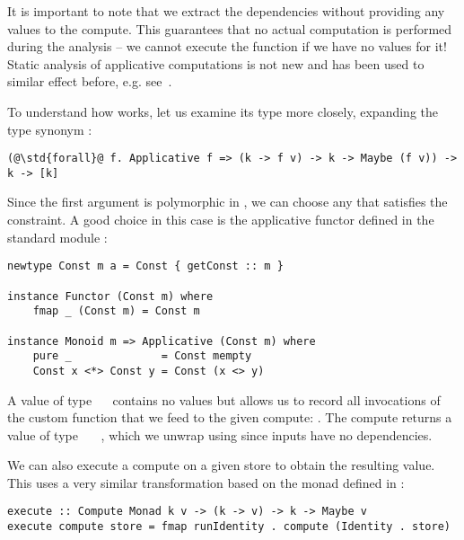 \noindent
It is important to note that we extract the dependencies without providing any
values to the compute. This guarantees that no actual computation is performed
during the analysis -- we cannot execute the function \hs{(+)} if we have no
values for it! Static analysis of applicative computations is not new and has
been used to similar effect before, e.g. see~\cite{free-applicatives}.

To understand how  works, let us examine its type more closely,
expanding the type synonym :

\vspace{1mm}
\begin{verbatim}
(@\std{forall}@ f. Applicative f => (k -> f v) -> k -> Maybe (f v)) -> k -> [k]
\end{verbatim}
\vspace{1mm}

\noindent
Since the first argument is polymorphic in , we can choose any  that
satisfies the  constraint. A good choice in this case is the
applicative functor  defined in the standard module
:

\vspace{1mm}
\begin{verbatim}
newtype Const m a = Const { getConst :: m }

instance Functor (Const m) where
    fmap _ (Const m) = Const m

instance Monoid m => Applicative (Const m) where
    pure _              = Const mempty
    Const x <*> Const y = Const (x <> y)
\end{verbatim}
\vspace{1mm}

\noindent
A value of type ~\hs{[}\hs{k]}~ contains no values  but
allows us to record all invocations of the custom  function that we
feed to the given compute: . The compute returns a
value of type ~~\hs{[}\hs{k]}~, which we unwrap
using  since inputs have no dependencies.

We can also execute a compute on a given store to obtain the resulting value.
This uses a very similar transformation based on the  monad
defined in :

\vspace{1mm}
\begin{verbatim}
execute :: Compute Monad k v -> (k -> v) -> k -> Maybe v
execute compute store = fmap runIdentity . compute (Identity . store)
\end{verbatim}
\vspace{1mm}

